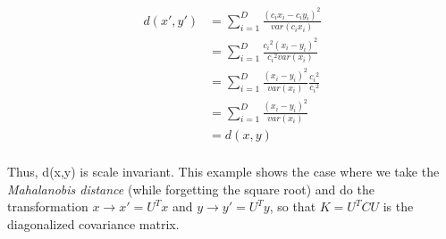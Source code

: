 \begin{align}
d({x}',{y}') &= \sum_{i=1}^{D}\frac{({c_i}x_i - {c_i}y_i)^2}{var({c_i}x_i)}\\
&= \sum_{i=1}^{D}\frac{{c_i}^2(x_i - y_i)^2}{{c_i}^2var(x_i)} \\
&= \sum_{i=1}^{D}\frac{(x_i - y_i)^2}{var(x_i)}\frac{{c_i}^2}{{c_i}^2} \\
&= \sum_{i=1}^{D}\frac{(x_i - y_i)^2}{var(x_i)} \\
&= d(x,y) \\
\end{align}




Thus, d(x,y) is scale invariant.
This example shows the case where we take the \emph{Mahalanobis distance} (while forgetting the square root) and 
do the transformation $x \rightarrow {x}' = U^{T}x$ and $y \rightarrow {y}' = U^{T}y$, so that $K = U^{T}CU$ is 
the diagonalized covariance matrix.


